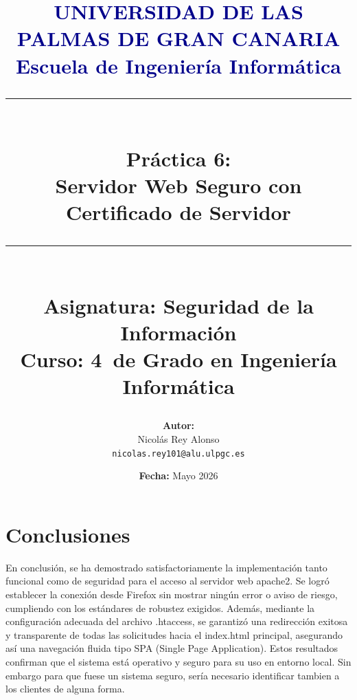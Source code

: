 \documentclass[12pt,a4paper]{report}
\title{
    \vspace*{-2cm}
    {\Large \textcolor{darkblue}{\textbf{UNIVERSIDAD DE LAS PALMAS DE GRAN CANARIA}}}\\
    {\Large \textcolor{darkblue}{\textbf{Escuela de Ingeniería Informática}}}\\
    \vspace{1cm}
    {\rule{\textwidth}{2pt}}\\
    \vspace{0.5cm}
    {\LARGE \textbf{Práctica 6:}}\\
    {\LARGE \textbf{Servidor Web Seguro con Certificado de Servidor}}\\
    \vspace{0.5cm}
    {\rule{\textwidth}{2pt}}\\
    \vspace{1cm}
    {\large \textbf{Asignatura:} Seguridad de la Información}\\
    {\large \textbf{Curso:} 4\textdegree\ de Grado en Ingeniería Informática}\\
    \vspace{1.5cm}
}
\author{
    \textbf{Autor:} \\
    Nicolás Rey Alonso\\
    \texttt{nicolas.rey101@alu.ulpgc.es}\\
}
\date{
    \vspace{1cm}
    \textbf{Fecha:} Mayo 2026
}
\begin{document}
\maketitle
\thispagestyle{firststyle}













\chapter{Conclusiones}
\label{chap:conclusiones}
En conclusión, se ha demostrado satisfactoriamente la implementación tanto funcional como de seguridad para el acceso al 
servidor web apache2. Se logró establecer la conexión desde Firefox sin mostrar ningún error o aviso de riesgo, 
cumpliendo con los estándares de robustez exigidos. Además, mediante la configuración adecuada del archivo .htaccess,
se garantizó una redirección exitosa y transparente de todas las solicitudes hacia el index.html principal,
asegurando así una navegación fluida tipo SPA (Single Page Application). Estos resultados confirman que el sistema está
operativo y seguro para su uso en entorno local. Sin embargo para que fuese un sistema seguro, sería necesario identificar tambien a los clientes de alguna forma.


\end{document}
